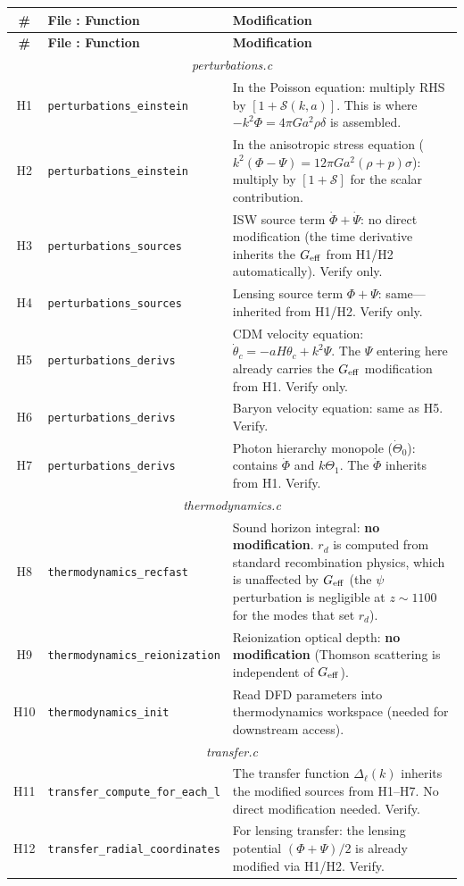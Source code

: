 \documentclass[11pt]{article}
\theoremstyle{definition}
\theoremstyle{remark}
\newcommand{\Geff}{G_{\rm eff}}
\begin{document}
\begin{longtable}{@{}clp{7cm}@{}}
\toprule
\textbf{\#} & \textbf{File : Function} & \textbf{Modification} \\
\midrule
\endfirsthead
\toprule
\textbf{\#} & \textbf{File : Function} & \textbf{Modification} \\
\midrule
\endhead
\multicolumn{3}{c}{\textit{perturbations.c}} \\
\midrule
H1 & \texttt{perturbations\_einstein} &
  In the Poisson equation: multiply RHS by
  $[1 + \mathcal{S}(k,a)]$. This is where
  $-k^2\Phi = 4\pi G a^2 \rho \delta$ is assembled. \\
H2 & \texttt{perturbations\_einstein} &
  In the anisotropic stress equation
  ($k^2(\Phi - \Psi) = 12\pi G a^2 (\rho + p)\sigma$):
  multiply by $[1 + \mathcal{S}]$ for the scalar
  contribution. \\
H3 & \texttt{perturbations\_sources} &
  ISW source term $\dot\Phi + \dot\Psi$: no direct
  modification (the time derivative inherits the
  $\Geff$ from H1/H2 automatically). Verify only. \\
H4 & \texttt{perturbations\_sources} &
  Lensing source term $\Phi + \Psi$: same---inherited
  from H1/H2. Verify only. \\
H5 & \texttt{perturbations\_derivs} &
  CDM velocity equation: $\dot\theta_c = -aH\theta_c +
  k^2 \Psi$. The $\Psi$ entering here already carries
  the $\Geff$ modification from H1. Verify only. \\
H6 & \texttt{perturbations\_derivs} &
  Baryon velocity equation: same as H5. Verify. \\
H7 & \texttt{perturbations\_derivs} &
  Photon hierarchy monopole ($\dot\Theta_0$):
  contains $\dot\Phi$ and $k\Theta_1$. The $\dot\Phi$
  inherits from H1. Verify. \\
\midrule
\multicolumn{3}{c}{\textit{thermodynamics.c}} \\
\midrule
H8 & \texttt{thermodynamics\_recfast} &
  Sound horizon integral: \textbf{no modification}.
  $r_d$ is computed from standard recombination physics,
  which is unaffected by $\Geff$ (the $\psi$ perturbation
  is negligible at $z \sim 1100$ for the modes that set $r_d$). \\
H9 & \texttt{thermodynamics\_reionization} &
  Reionization optical depth: \textbf{no modification}
  (Thomson scattering is independent of $\Geff$). \\
H10 & \texttt{thermodynamics\_init} &
  Read DFD parameters into thermodynamics workspace
  (needed for downstream access). \\
\midrule
\multicolumn{3}{c}{\textit{transfer.c}} \\
\midrule
H11 & \texttt{transfer\_compute\_for\_each\_l} &
  The transfer function $\Delta_\ell(k)$ inherits the
  modified sources from H1--H7. No direct modification
  needed. Verify. \\
H12 & \texttt{transfer\_radial\_coordinates} &
  For lensing transfer: the lensing potential
  $(\Phi + \Psi)/2$ is already modified via H1/H2.
  Verify. \\
\bottomrule
\end{longtable}
\end{document}
